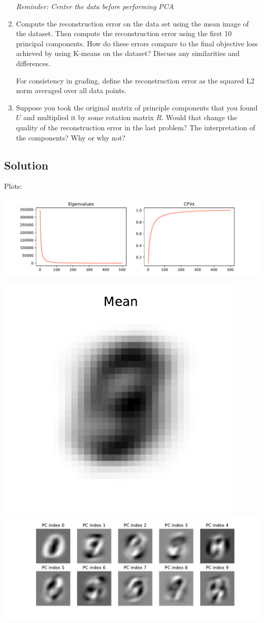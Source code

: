 \documentclass[submit]{harvardml}
\begin{document}
\begin{problem}
\begin{enumerate}
  \textit{Reminder: Center the data before performing PCA}

\item Compute the reconstruction error on the data set using the mean
  image of the dataset.  Then compute the reconstruction error using
  the first 10 principal components.  How do these errors compare to
  the final objective loss achieved by using K-means on the dataset?
  Discuss any similarities and differences.

  For consistency in grading, define the reconstruction error as the squared L2
  norm averaged over all data points.

\item Suppose you took the original matrix of principle components
  that you found $U$ and multiplied it by some rotation matrix $R$.
  Would that change the quality of the reconstruction error in the
  last problem?  The interpretation of the components?  Why or why
  not?
  
\end{enumerate}


\end{problem}

\newpage
\subsection*{Solution}
Plots:

 \includegraphics[width=\linewidth]{HW5/p2_cfvs (6).pdf}

\includegraphics[width=0.25\linewidth]{p2_mean}
\includegraphics[width=0.75\linewidth]{p2_pcomps}
\end{document}
